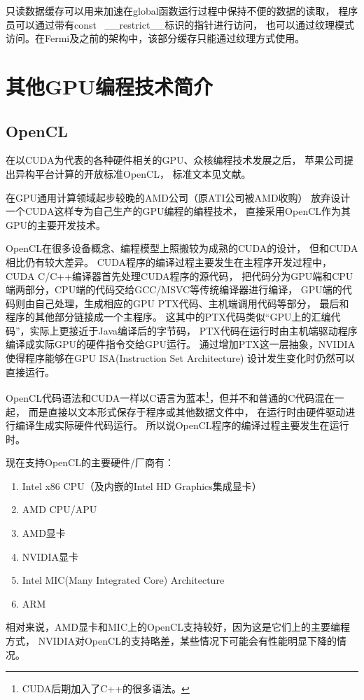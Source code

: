 只读数据缓存可以用来加速在global函数运行过程中保持不便的数据的读取，
程序员可以通过带有const  \_\_restrict\_\_标识的指针进行访问，
也可以通过纹理模式访问。在Fermi及之前的架构中，该部分缓存只能通过纹理方式使用。
\cite{cudadoc-KeplerGK110ArchitectureWhitepaper}



\section{其他GPU编程技术简介}

\subsection{OpenCL}

在以CUDA为代表的各种硬件相关的GPU、众核编程技术发展之后，
苹果公司提出异构平台计算的开放标准OpenCL，
标准文本见文献。

在GPU通用计算领域起步较晚的AMD公司（原ATI公司被AMD收购）
放弃设计一个CUDA这样专为自己生产的GPU编程的编程技术，
直接采用OpenCL作为其GPU的主要开发技术。

OpenCL在很多设备概念、编程模型上照搬较为成熟的CUDA的设计，
但和CUDA相比仍有较大差异。
CUDA程序的编译过程主要发生在主程序开发过程中，CUDA C/C++编译器首先处理CUDA程序的源代码，
把代码分为GPU端和CPU端两部分，CPU端的代码交给GCC/MSVC等传统编译器进行编译，
GPU端的代码则由自己处理，生成相应的GPU PTX代码、主机端调用代码等部分，
最后和程序的其他部分链接成一个主程序。
这其中的PTX代码类似“GPU上的汇编代码”，实际上更接近于Java编译后的字节码，
PTX代码在运行时由主机端驱动程序编译成实际GPU的硬件指令交给GPU运行。
通过增加PTX这一层抽象，NVIDIA使得程序能够在GPU ISA(Instruction Set Architecture)
设计发生变化时仍然可以直接运行。

OpenCL代码语法和CUDA一样以C语言为蓝本\footnote{CUDA后期加入了C++的很多语法。}，但并不和普通的C代码混在一起，
而是直接以文本形式保存于程序或其他数据文件中，
在运行时由硬件驱动进行编译生成实际硬件代码运行。
所以说OpenCL程序的编译过程主要发生在运行时。

现在支持OpenCL的主要硬件/厂商有：\cite{opencl-conformant-products}
\begin{enumerate}[1)]
\item Intel x86 CPU（及内嵌的Intel HD Graphics集成显卡）
\item AMD CPU/APU
\item AMD显卡
\item NVIDIA显卡
\item Intel MIC(Many Integrated Core) Architecture
\item ARM
\end{enumerate}
相对来说，AMD显卡和MIC上的OpenCL支持较好，因为这是它们上的主要编程方式，
NVIDIA对OpenCL的支持略差，某些情况下可能会有性能明显下降的情况。


